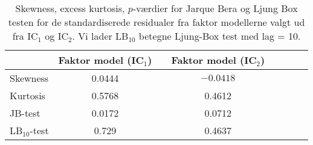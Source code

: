 \begin{table}
\center
\begin{tabular}{lccccccc} \toprule
& Faktor model (IC$_1$) & & Faktor model (IC$_2$)  \\ \midrule
Skewness & 0.0444 & & $-0.0418$     \\
Kurtosis & 0.5768 & & 0.4612 \\
JB-test & 0.0172 & & 0.0712 \\ 
LB$_{10}$-test & 0.729  && 0.4637  \\ \bottomrule
\end{tabular}
\caption{Skewness, excess kurtosis, $p$-værdier for Jarque Bera og Ljung Box testen for de standardiserede residualer fra faktor modellerne valgt ud fra IC$_1$ og IC$_2$. Vi lader LB$_{10}$ betegne Ljung-Box test med lag = 10. } \label{tab:test_faktor}
\end{table}
